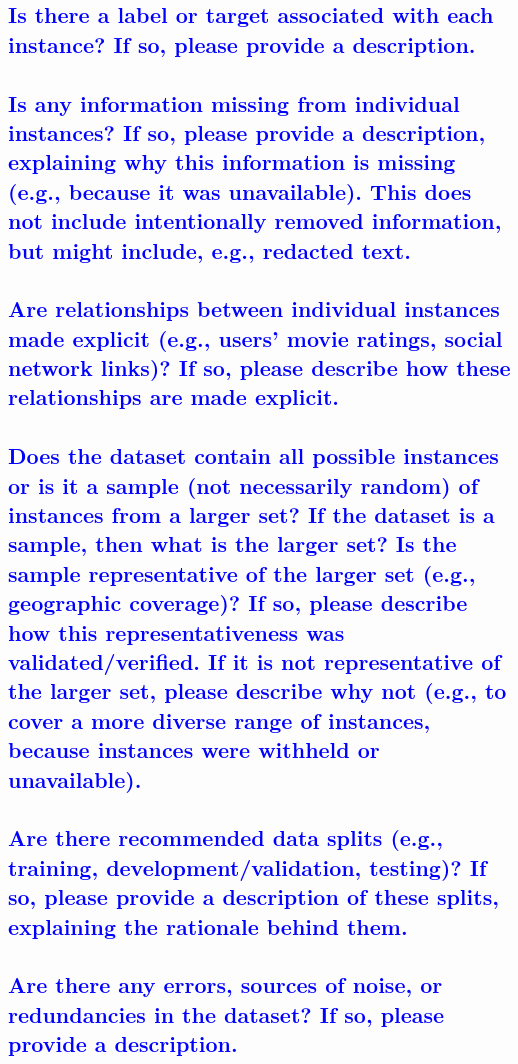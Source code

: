 \documentclass[letterpaper, 10 pt, conference]{ieeeconf}  %
\begin{document}
\textcolor{blue}{\subsection{Is there a label or target associated with each instance? If so, please
provide a description.}}
\lipsum[1]

\textcolor{blue}{\subsection{Is any information missing from individual instances? If so, please
provide a description, explaining why this information is missing (e.g., because it was unavailable). This does not include intentionally removed
information, but might include, e.g., redacted text.}}
\lipsum[1]

\textcolor{blue}{\subsection{Are relationships between individual instances made explicit (e.g.,
users’ movie ratings, social network links)? If so, please describe
how these relationships are made explicit.}}
\lipsum[1]

\textcolor{blue}{\subsection{Does the dataset contain all possible instances or is it a sample (not
necessarily random) of instances from a larger set? If the dataset is
a sample, then what is the larger set? Is the sample representative of the
larger set (e.g., geographic coverage)? If so, please describe how this
representativeness was validated/verified. If it is not representative of the
larger set, please describe why not (e.g., to cover a more diverse range of
instances, because instances were withheld or unavailable).}}
\lipsum[1]

\textcolor{blue}{\subsection{Are there recommended data splits (e.g., training, development/validation, testing)? If so, please provide a description of these
splits, explaining the rationale behind them.}}
\lipsum[1]

\textcolor{blue}{\subsection{Are there any errors, sources of noise, or redundancies in the
dataset? If so, please provide a description.}}
\lipsum[1]
\end{document}
